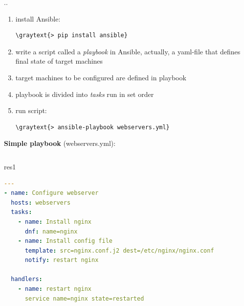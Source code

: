 \documentclass[pdf, 8pt, unicode, t]{beamer} %
\newcommand{\graytext}[1]{{\usebeamercolor[fg]{graytext_color}#1}}
\newcommand{\myinsertsubsection}{\alert{\Large\insertsectionnumber.\insertsubsectionnumber. \insertsubsection}\\}
\begin{document}
\begin{frame}[fragile, label=none]
%
\myinsertsubsection

\begin{enumerate}
\item install Ansible:
\begin{Verbatim}[commandchars=\\\{\}]
\graytext{> pip install ansible}
\end{Verbatim}
\item write a script called a {\it playbook} in Ansible, actually, a yaml-file
that defines final state of target machines
\item target machines to be configured are defined in playbook
\item playbook is divided into {\it tasks} run in set order
\item run script:
\begin{Verbatim}[commandchars=\\\{\}]
\graytext{> ansible-playbook webservers.yml}
\end{Verbatim}
\end{enumerate}
%
\vspace{2mm}
{\bf Simple playbook} (webservers.yml):
\vspace{1mm}
%
\begin{columns}[t]
\begin{beamercolorbox}[sep=-1.0em,rounded=true,shadow=true,center]{res1}
\begin{lstlisting}[language=yaml]
---
- name: Configure webserver
  hosts: webservers
  tasks:
    - name: Install nginx
      dnf: name=nginx
    - name: Install config file
      template: src=nginx.conf.j2 dest=/etc/nginx/nginx.conf
      notify: restart nginx

  handlers:
    - name: restart nginx
      service name=nginx state=restarted
\end{lstlisting}
\end{beamercolorbox}
\end{columns}
\end{frame}
\end{document}
